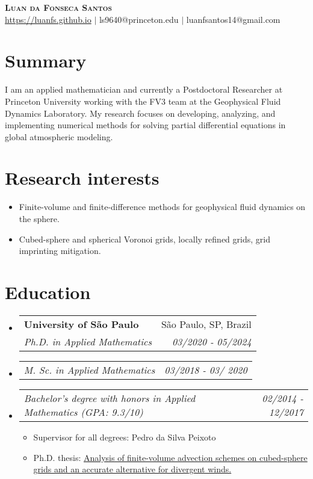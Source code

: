\documentclass[letterpaper,11pt]{article}
\makeatletter
\newcommand{\resumeSubheading}[4]{
  \vspace{-2pt}\item
    \begin{tabular*}{0.97\textwidth}[t]{l@{\extracolsep{\fill}}r}
      \textbf{#1} & #2 \\
      \textit{\small#3} & \textit{\small #4} \\
    \end{tabular*}\vspace{-7pt}
}
\newcommand{\resumeSubSubheading}[2]{
    \item
    \begin{tabular*}{0.97\textwidth}{l@{\extracolsep{\fill}}r}
      \textit{\small#1} & \textit{\small #2} \\
    \end{tabular*}\vspace{-7pt}
}
\newcommand{\resumeSubHeadingListStart}{\begin{itemize}[leftmargin=0.15in, label={}]}
\newcommand{\resumeSubHeadingListEnd}{\end{itemize}}
\makeatother
\begin{document}
\begin{center}
    \textbf{\Huge \scshape Luan da Fonseca Santos} \\ \vspace{1pt}
    \href{https://luanfs.github.io}{https://luanfs.github.io} $|$
    ls9640@princeton.edu
    $|$  
    {luanfsantos14@gmail.com} 
\end{center}

\section{Summary}
I am an applied mathematician and currently a Postdoctoral Researcher at Princeton University working with the FV3 team at the Geophysical Fluid Dynamics Laboratory.
My research focuses on developing, analyzing, and implementing  numerical methods for solving partial differential equations in global atmospheric modeling.

\section{Research interests}
\begin{itemize}
	\item Finite-volume and finite-difference methods for geophysical fluid dynamics on the sphere.
	\item Cubed-sphere and spherical Voronoi grids, locally refined grids, grid imprinting mitigation.
\end{itemize}

\section{Education}
\resumeSubHeadingListStart
\resumeSubheading
{University of São Paulo }{São Paulo, SP, Brazil}
{Ph.D. in Applied Mathematics}{03/2020 - 05/2024}  

\resumeSubSubheading{M. Sc. in Applied Mathematics}{03/2018 - 03/ 2020}

\resumeSubSubheading{Bachelor's degree with honors in Applied Mathematics (GPA: 9.3/10)}{02/2014 - 12/2017}
\begin{itemize}
	\item Supervisor for all degrees: Pedro da Silva Peixoto
	\item Ph.D. thesis: \href{https://www.teses.usp.br/teses/disponiveis/45/45132/tde-29052024-125153/en.php}{Analysis of finite-volume advection
	schemes on cubed-sphere grids and an
	accurate alternative for divergent winds.}
\end{itemize}
\resumeSubHeadingListEnd
\end{document}

